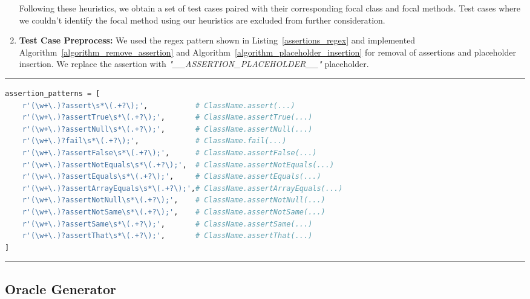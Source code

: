 \begin{enumerate}
  Following these heuristics, we obtain a set of test cases paired with their corresponding focal class and focal methods. Test cases where we couldn't identify the focal method using our heuristics are excluded from further consideration.

  \item \textbf{Test Case Preprocess:} We used the regex pattern shown in Listing~\ref{assertions_regex} and implemented Algorithm~\ref{algorithm_remove_assertion} and Algorithm~\ref{algorithm_placeholder_insertion} for removal of assertions and placeholder insertion. We replace the assertion with \textit{"\_\_ASSERTION\_PLACEHOLDER\_\_"} placeholder. 
      
\end{enumerate}

\hrule
\begin{lstlisting}[language=Python, caption=Assertion selection Regex, label=assertions_regex]
assertion_patterns = [
    r'(\w+\.)?assert\s*\(.+?\);',           # ClassName.assert(...)
    r'(\w+\.)?assertTrue\s*\(.+?\);',       # ClassName.assertTrue(...)
    r'(\w+\.)?assertNull\s*\(.+?\);',       # ClassName.assertNull(...)
    r'(\w+\.)?fail\s*\(.+?\);',             # ClassName.fail(...)
    r'(\w+\.)?assertFalse\s*\(.+?\);',      # ClassName.assertFalse(...)
    r'(\w+\.)?assertNotEquals\s*\(.+?\);',  # ClassName.assertNotEquals(...)
    r'(\w+\.)?assertEquals\s*\(.+?\);',     # ClassName.assertEquals(...)
    r'(\w+\.)?assertArrayEquals\s*\(.+?\);',# ClassName.assertArrayEquals(...)
    r'(\w+\.)?assertNotNull\s*\(.+?\);',    # ClassName.assertNotNull(...)
    r'(\w+\.)?assertNotSame\s*\(.+?\);',    # ClassName.assertNotSame(...)
    r'(\w+\.)?assertSame\s*\(.+?\);',       # ClassName.assertSame(...)
    r'(\w+\.)?assertThat\s*\(.+?\);',       # ClassName.assertThat(...)
]
\end{lstlisting}
\hrule
    
\vspace{0.1 cm}
\subsection{Oracle Generator}
\label{sec:oracle_generator_implementation}
\vspace{0.1 cm}

